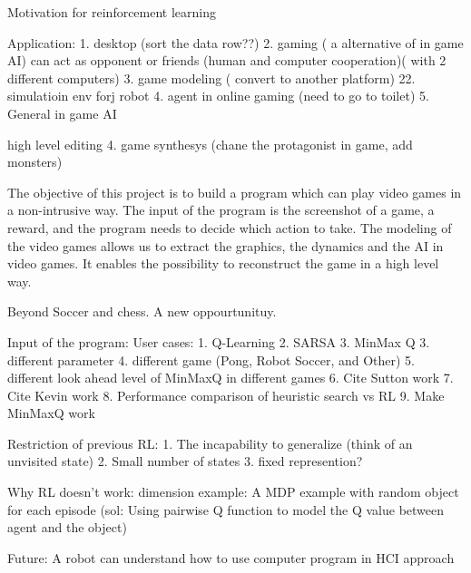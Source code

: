 Motivation for reinforcement learning

Application:
1. desktop (sort the data row??)
2. gaming ( a alternative of in game AI) can act as opponent or friends (human and computer cooperation)( with 2 different computers)
3. game modeling ( convert to another platform)
22. simulatioin env forj robot
4. agent in online gaming (need to go to toilet)
5. General in game AI

high level editing
4. game synthesys (chane the protagonist in game, add monsters)

The objective of this project is to build a program which can play video games 
in a non-intrusive way. The input of the program is the screenshot of a game, a reward,
and the program needs to decide which action to take.
The modeling of the video games allows us to extract the graphics, the dynamics
and the AI in video games. It enables the possibility to reconstruct the game in 
a high level way. 

Beyond Soccer and chess. A new oppourtunituy.

Input of the program:
User cases:
1. Q-Learning
2. SARSA
3. MinMax Q
3. different parameter
4. different game (Pong, Robot Soccer, and Other)
5. different look ahead level of MinMaxQ in different games
6. Cite Sutton work
7. Cite Kevin work
8. Performance comparison of heuristic search vs RL
9. Make MinMaxQ work

Restriction of previous RL:
1. The incapability to generalize (think of an unvisited state)
2. Small number of states
3. fixed represention?

Why RL doesn't work:
dimension
example:
A MDP example with random object for each episode
(sol: Using pairwise Q function to model the Q value between agent and the object)

Future:
A robot can understand how to use computer program in HCI approach


